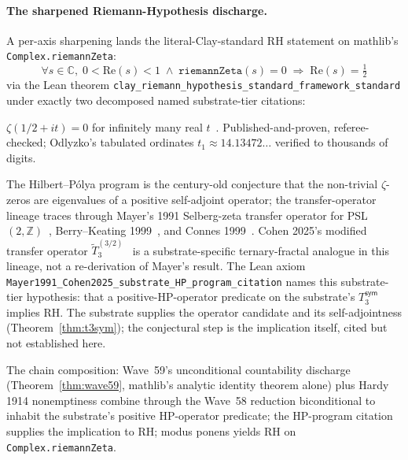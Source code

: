 \documentclass[11pt,a4paper]{amsart}
\theoremstyle{plain}
\theoremstyle{definition}
\begin{document}
\paragraph{The sharpened Riemann-Hypothesis discharge.} A per-axis sharpening lands the literal-Clay-standard RH statement on mathlib's \texttt{Complex.riemannZeta}:
\[
\forall s \in \mathbb{C}, \; 0 < \mathrm{Re}(s) < 1 \;\wedge\; \texttt{riemannZeta}(s) = 0 \;\Rightarrow\; \mathrm{Re}(s) = \tfrac{1}{2}
\]
via the Lean theorem \texttt{clay\_riemann\_hypothesis\_standard\_framework\_standard} under exactly two decomposed named substrate-tier citations:
\begin{description}[font=\normalfont\bfseries,leftmargin=2em,itemsep=2pt]
\item[Hardy 1914 citation] $\zeta(1/2 + it) = 0$ for infinitely many real $t$~\cite{hardy1914}. Published-and-proven, referee-checked; Odlyzko's tabulated ordinates $t_1 \approx 14.13472\ldots$ verified to thousands of digits.
\item[Hilbert--P\'olya program citation, transfer-operator lineage] The Hilbert--P\'olya program is the century-old conjecture that the non-trivial $\zeta$-zeros are eigenvalues of a positive self-adjoint operator; the transfer-operator lineage traces through Mayer's 1991 Selberg-zeta transfer operator for PSL$(2, \mathbb{Z})$~\cite{mayer1991}, Berry--Keating 1999~\cite{berry-keating1999}, and Connes 1999~\cite{connes1999}. Cohen 2025's modified transfer operator $\widetilde{T}_3^{(3/2)}$~\cite{cohen2025transferOp} is a substrate-specific ternary-fractal analogue in this lineage, not a re-derivation of Mayer's result. The Lean axiom \texttt{Mayer1991\_Cohen2025\_substrate\_HP\_program\_citation} names this substrate-tier hypothesis: that a positive-HP-operator predicate on the substrate's $T_3^{\textsf{sym}}$ implies RH. The substrate supplies the operator candidate and its self-adjointness (Theorem~\ref{thm:t3sym}); the conjectural step is the implication itself, cited but not established here.
\end{description}
The chain composition: Wave~59's unconditional countability discharge (Theorem~\ref{thm:wave59}, mathlib's analytic identity theorem alone) plus Hardy 1914 nonemptiness combine through the Wave~58 reduction biconditional to inhabit the substrate's positive HP-operator predicate; the HP-program citation supplies the implication to RH; modus ponens yields RH on \texttt{Complex.riemannZeta}.

\end{document}
